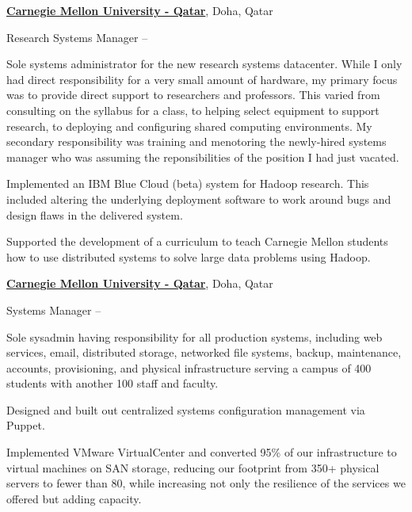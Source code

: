\documentclass[letterpaper,10pt,oneside]{article}
\begin{document}
\begin{body}
\href{http://qatar.cmu.edu/}
{\textbf{Carnegie Mellon University - Qatar}},
Doha, Qatar
\par
Research Systems Manager
\hfill
{} -- 

\begin{detail}
  
Sole systems administrator for the new research systems datacenter.  While
I only had direct responsibility for a very small amount of hardware, my
primary focus was to provide direct support to researchers and professors.
This varied from consulting on the syllabus for a class, to helping select
equipment to support research, to deploying and configuring shared
computing environments.  My secondary responsibility was training and
menotoring the newly-hired systems manager who was assuming the
reponsibilities of the position I had just vacated.
  
\BulletItem
Implemented an IBM Blue Cloud (beta) system for Hadoop research.  This
included altering the underlying deployment software to work around bugs
and design flaws in the delivered system.

\BulletItem
Supported the development of a curriculum to teach Carnegie Mellon students
how to use distributed systems to solve large data problems using Hadoop.

\end{detail}
\EntryGap


\href{http://qatar.cmu.edu/}
{\textbf{Carnegie Mellon University - Qatar}},
Doha, Qatar
\par
Systems Manager
\hfill
{} -- 

\begin{detail}

Sole sysadmin having responsibility for all production systems, including
web services, email, distributed storage, networked file systems, backup,
maintenance, accounts, provisioning, and physical infrastructure serving a
campus of 400 students with another 100 staff and faculty.

\BulletItem Designed and built out centralized systems configuration
management via Puppet.

\BulletItem Implemented VMware VirtualCenter and converted 95\% of our
infrastructure to virtual machines on SAN storage, reducing our footprint
from 350+ physical servers to fewer than 80, while increasing not only the
resilience of the services we offered but adding capacity.


\end{detail}
\end{body}
\end{document}
